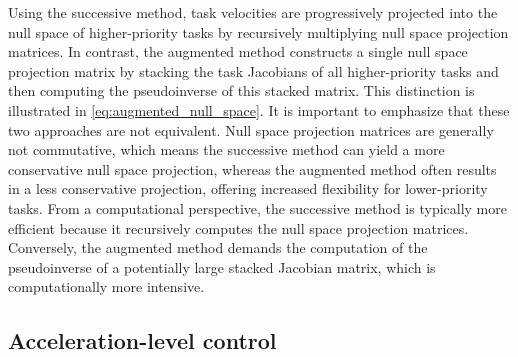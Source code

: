 Using the successive method, task velocities are progressively projected into the null space of higher-priority tasks by recursively multiplying null space projection matrices. In contrast, the augmented method constructs a single null space projection matrix by stacking the task Jacobians of all higher-priority tasks and then computing the pseudoinverse of this stacked matrix. This distinction is illustrated in \autoref{eq:augmented_null_space}.
It is important to emphasize that these two approaches are not equivalent. Null space projection matrices are generally not commutative, which means the successive method can yield a more conservative null space projection, whereas the augmented method often results in a less conservative projection, offering increased flexibility for lower-priority tasks.
From a computational perspective, the successive method is typically more efficient because it recursively computes the null space projection matrices. Conversely, the augmented method demands the computation of the pseudoinverse of a potentially large stacked Jacobian matrix, which is computationally more intensive.

\subsection{Acceleration-level control}

